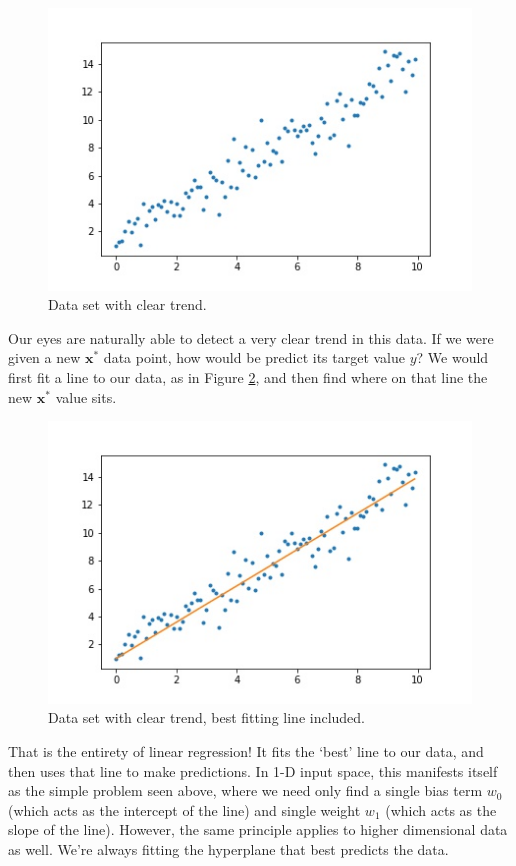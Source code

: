 \begin{figure}
    \centering
    \includegraphics[width=0.5\paperwidth]{../LinearRegression/fig/simple_lin_reg_GEN.jpg}
    \caption{Data set with clear trend.}
    \label{fig:simple-lin-reg}
\end{figure}

Our eyes are naturally able to detect a very clear trend in this data. If we were given a new $\textbf{x}^{*}$ data point, how would be predict its target value $y$? We would first fit a line to our data, as in Figure \ref{fig:simple-lin-reg-w-line}, and then find where on that line the new $\textbf{x}^{*}$ value sits.

\begin{figure}
    \centering
    \includegraphics[width=0.5\paperwidth]{../LinearRegression/fig/simple_lin_reg_w_line_GEN.jpg}
    \caption{Data set with clear trend, best fitting line included.}
    \label{fig:simple-lin-reg-w-line}
\end{figure}

That is the entirety of linear regression! It fits the `best' line to our data, and then uses that line to make predictions. In 1-D input space, this manifests itself as the simple problem seen above, where we need only find a single bias term $w_{0}$ (which acts as the intercept of the line) and single weight $w_{1}$ (which acts as the slope of the line). However, the same principle applies to higher dimensional data as well. We're always fitting the hyperplane that best predicts the data.

